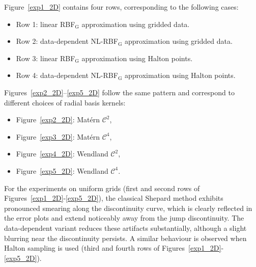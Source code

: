 \documentclass[preprint]{elsarticle}       %
\begin{document}
Figure~\ref{exp1_2D} contains four rows, corresponding to the following cases:
\begin{itemize}
    \item Row 1: linear RBF\(_{\text{G}}\) approximation using gridded data.
    \item Row 2: data-dependent NL-RBF\(_{\text{G}}\) approximation using gridded data.
    \item Row 3: linear RBF\(_{\text{G}}\) approximation using Halton points.
    \item Row 4: data-dependent NL-RBF\(_{\text{G}}\) approximation using Halton points.
\end{itemize}

Figures~\ref{exp2_2D}--\ref{exp5_2D} follow the same pattern and correspond to different choices of radial basis kernels:
\begin{itemize}
    \item Figure~\ref{exp2_2D}: Mat\'ern \(\mathcal{C}^2\),
    \item Figure~\ref{exp3_2D}: Mat\'ern \(\mathcal{C}^4\),
    \item Figure~\ref{exp4_2D}: Wendland \(\mathcal{C}^2\),
    \item Figure~\ref{exp5_2D}: Wendland \(\mathcal{C}^4\).
\end{itemize}

For the experiments on uniform grids (first and second rows of Figures~\ref{exp1_2D}-\ref{exp5_2D}), the classical Shepard method exhibits pronounced smearing along the discontinuity curve, which is clearly reflected in the error plots and extend noticeably away from the jump discontinuity. The data-dependent variant reduces these artifacts substantially, although a slight blurring near the discontinuity persists. A similar behaviour is observed when Halton sampling is used (third and fourth rows of Figures~\ref{exp1_2D}-\ref{exp5_2D}).
\end{document}
